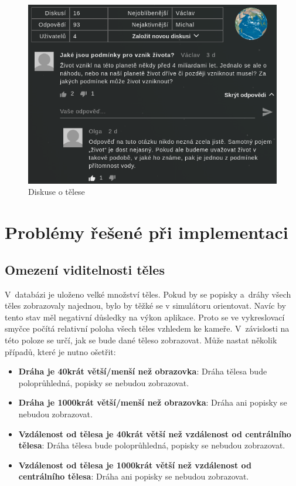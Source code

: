 \documentclass[a4paper,12pt]{article}
\begin{document}
\begin{figure}[H]
\begin{center}
\includegraphics[width=350pt]{Images/Discussion.png}
\caption{Diskuse o tělese}
\label{BodiesList}
\end{center}
\end{figure}

\section{Problémy řešené při implementaci}

\subsection{Omezení viditelnosti těles}

V~databázi je uloženo velké množství těles. Pokud by se popisky a~dráhy všech těles zobrazovaly najednou, bylo by těžké se v simulátoru orientovat. Navíc by tento stav měl negativní důsledky na výkon aplikace. Proto se ve vykreslovací smyčce počítá relativní poloha všech těles vzhledem ke kameře. V~závislosti na této poloze se určí, jak se bude dané těleso zobrazovat. Může nastat několik případů, které je nutno ošetřit:

\begin{itemize}
\item \textbf{Dráha je 40krát větší/menší než obrazovka}: Dráha tělesa bude poloprůhledná, popisky se nebudou zobrazovat.
\item \textbf{Dráha je 1000krát větší/menší než obrazovka}: Dráha ani popisky se nebudou zobrazovat.
\item \textbf{Vzdálenost od tělesa je 40krát větší než vzdálenost od centrálního tělesa}: Dráha tělesa bude poloprůhledná, popisky se nebudou zobrazovat.
\item \textbf{Vzdálenost od tělesa je 1000krát větší než vzdálenost od centrálního tělesa}: Dráha ani popisky se nebudou zobrazovat.
\end{itemize} 
\end{document}
